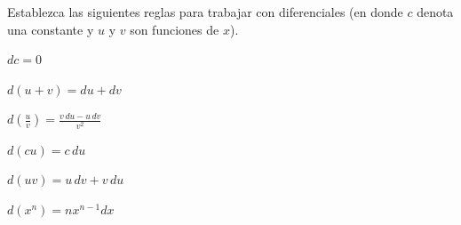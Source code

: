 \item Establezca las siguientes reglas para trabajar con diferenciales (en donde $c$ denota una constante y $u$ y $v$ son funciones de $x$).
\begin{enumerate}
    \begin{minipage}{0.45\textwidth}
    \item[(a)] $dc = 0$
    \item[(c)] $d(u + v) = du + dv$
    \item[(e)] $\displaystyle d\left(\frac{u}{v}\right) = \frac{v \, du - u \, dv}{v^2}$
    \end{minipage}%
    \begin{minipage}{0.45\textwidth}
    \item[(b)] $d(cu) = c \, du$
    \item[(d)] $d(uv) = u \, dv + v \, du$
    \item[(f)] $d(x^n) = nx^{n-1} dx$
    \end{minipage}
\end{enumerate}
